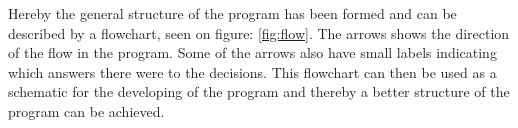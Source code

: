 
Hereby the general structure of the program has been formed and can be described by a flowchart, seen on figure: \ref{fig:flow}.
The arrows shows the direction of the flow in the program. Some of the arrows also have small labels indicating which answers there were to the decisions.
This flowchart can then be used as a schematic for the developing of the program and thereby a better structure of the program can be achieved.